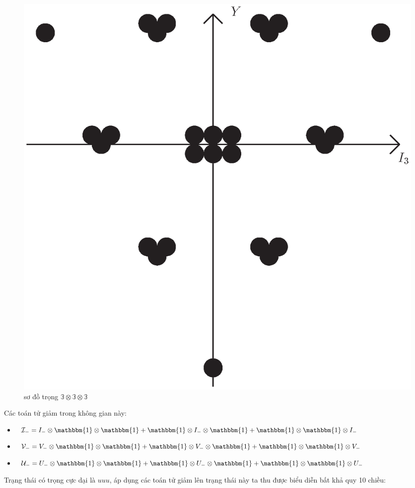 \documentclass{report}
\begin{document}
	\begin{figure}[!htb]
		\centering
		\includegraphics[scale=0.5]{diagram9.eps}
		\caption{sơ đồ trọng \( \mathbb{3} \otimes \mathbb{3} \otimes \mathbb{3} \)}
	\end{figure}

Các toán tử giảm trong không gian này:

	\begin{itemize}
		\item \( \mathcal{I}_{-} = I_{-} \otimes \mathbbm{1} \otimes \mathbbm{1} + \mathbbm{1} \otimes I_{-} \otimes \mathbbm{1} + \mathbbm{1} \otimes \mathbbm{1} \otimes I_{-} \)
		\item \( \mathcal{V}_{-} = V_{-} \otimes \mathbbm{1} \otimes \mathbbm{1} + \mathbbm{1} \otimes V_{-} \otimes \mathbbm{1} + \mathbbm{1} \otimes \mathbbm{1} \otimes V_{-} \)
		\item \( \mathcal{U}_{-} = U_{-} \otimes \mathbbm{1} \otimes \mathbbm{1} + \mathbbm{1} \otimes U_{-} \otimes \mathbbm{1} + \mathbbm{1} \otimes \mathbbm{1} \otimes U_{-} \)
	\end{itemize}	
	
Trạng thái có trọng cực dại là \( uuu \), áp dụng các toán tử giảm lên trạng thái này ta thu được biểu diễn bất khả quy 10 chiều:
\end{document}

